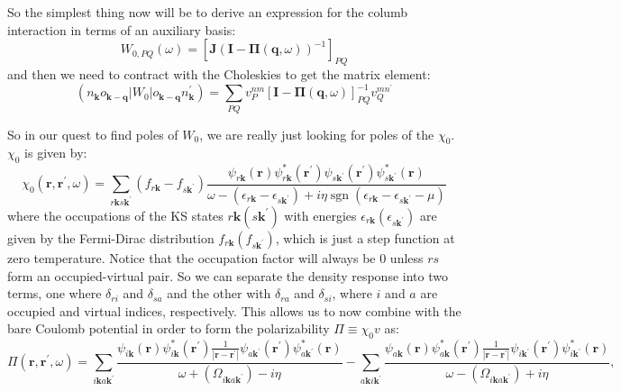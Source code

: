 \documentclass[12pt]{article}
\begin{document}
So the simplest thing now will be to derive an expression for the columb interaction in terms of an auxiliary basis:
\begin{equation}
W_{0, PQ}(\omega)=\left[\mathbf{J}(\mathbf{I}-\mathbf{\Pi}(\mathbf{q}, \omega))^{-1}\right]_{PQ}
\end{equation}
and then we need to contract with the Choleskies to get the matrix element:
\begin{equation}
    (n_{\mathbf{k}}o_{\mathbf{k-q}}|W_0|o_{\mathbf{k-q}}n^\prime_{\mathbf{k}}) =\sum_{PQ} v_{P}^{nm}\left[\mathbf{I}-\mathbf{\Pi}\left(\mathbf{q}, \omega\right)\right]_{PQ}^{-1} v_{Q}^{mn^{\prime}}
\end{equation}

So in our quest to find poles of $W_0$, we are really just looking for poles of the $\chi_0$. $\chi_0$ is given by:
\begin{equation}
\chi_{0}\left(\mathbf{r}, \mathbf{r}^{\prime}, \omega\right)=\sum_{r\mathbf{k} s \mathbf{k}^{\prime}}\left(f_{r \mathbf{k}}-f_{s \mathbf{k}^{\prime}}\right) \frac{\psi_{r \mathbf{k}}(\mathbf{r}) \psi_{r \mathbf{k}}^{*}\left(\mathbf{r}^{\prime}\right) \psi_{s \mathbf{k}^{\prime}}\left(\mathbf{r}^{\prime}\right) \psi_{s \mathbf{k}^{\prime}}^{*}(\mathbf{r})}{\omega-\left(\epsilon_{r \mathbf{k}}-\epsilon_{s \mathbf{k}^{\prime}}\right)+i \eta \operatorname{sgn}\left(\epsilon_{r \mathbf{k}}-\epsilon_{s \mathbf{k}^{\prime} } - \mu\right)}
\end{equation}
where the occupations of the KS states \(r\mathbf{k}(s\mathbf{k}^{\prime})\) with energies \(\epsilon_{r\mathbf{k}}(\epsilon_{s\mathbf{k}^{\prime}})\) are given by the Fermi-Dirac distribution \(f_{r\mathbf{k}}(f_{s\mathbf{k}^{\prime}})\), which is just a step function at zero temperature. Notice that the occupation factor will always be 0 unless \(rs\) form an occupied-virtual pair. So we can separate the density response into two terms, one where \(\delta_{ri}\) and \(\delta_{sa}\) and the other with \(\delta_{ra}\) and \(\delta_{si}\), where \(i\) and \(a\) are occupied and virtual indices, respectively. This allows us to now combine with the bare Coulomb potential in order to form the polarizability \(\Pi\equiv \chi_0v\) as:
\begin{equation}
\Pi\left(\mathbf{r}, \mathbf{r}^{\prime}, \omega\right)=\sum_{i\mathbf{k}a\mathbf{k}^{\prime}}\frac{\psi_{i\mathbf{k}}(\mathbf{r}) \psi_{i\mathbf{k}}^{*}\left(\mathbf{r}^{\prime}\right)\frac{1}{|\mathbf{r}-\mathbf{r}^\prime|} \psi_{a\mathbf{k}^{\prime}}\left(\mathbf{r}^{\prime}\right) \psi_{a\mathbf{k}^{\prime}}^{*}(\mathbf{r})}{\omega+\left(\Omega_{i\mathbf{k}a\mathbf{k}^{\prime}}\right)-i\eta } - \sum_{a\mathbf{k}i\mathbf{k}^{\prime}}\frac{\psi_{a\mathbf{k}}(\mathbf{r}) \psi_{a\mathbf{k}}^{*}\left(\mathbf{r}^{\prime}\right) \frac{1}{|\mathbf{r}-\mathbf{r}^\prime|}\psi_{i\mathbf{k}^{\prime}}\left(\mathbf{r}^{\prime}\right) \psi_{i\mathbf{k}^{\prime}}^{*}(\mathbf{r})}{\omega-\left(\Omega_{i\mathbf{k}a\mathbf{k}^{\prime}}\right)+i\eta },
\end{equation}
\end{document}
